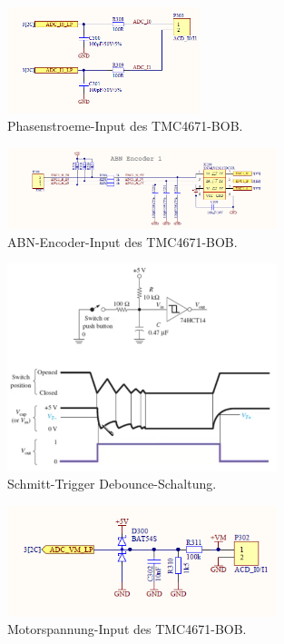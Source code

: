 \begin{figure}[H]
	\centering
	\includegraphics[width=0.5\textwidth]{graphics/TMC4671_Phasenstroeme_BOB_Schematic}
	\caption{Phasenstroeme-Input des TMC4671-BOB. \cite{trinamicmotion_control_gmbh__co_kg_tmc4671-bob_2020}}
	\label{fig:Schema_Phasenstroeme_FOC_Treiber}
\end{figure} 

\begin{figure}[H]
	\centering
	\includegraphics[width=0.7\textwidth]{graphics/TMC4671_ABN_Encoder_BOB_Schematic}
	\caption{ABN-Encoder-Input des TMC4671-BOB. \cite{trinamicmotion_control_gmbh__co_kg_tmc4671-bob_2020}}
	\label{fig:Schema_ABN_Encoder_FOC_Treiber}
\end{figure} 

\begin{figure}[H]
	\centering
	\includegraphics[width=0.7\textwidth]{graphics/Schmitt_Trigger_Debounce}
	\caption{Schmitt-Trigger Debounce-Schaltung.}
	\label{fig:Schmitt_Trigger_Debounce}
\end{figure} 

\begin{figure}[H]
	\centering
	\includegraphics[width=0.7\textwidth]{graphics/TMC4671_Motorspannung_BOB_Schematic}
	\caption{Motorspannung-Input des TMC4671-BOB. \cite{trinamicmotion_control_gmbh__co_kg_tmc4671-bob_2020}}
	\label{fig:Schema_Motorspannung_FOC_Treiber}
\end{figure} 

